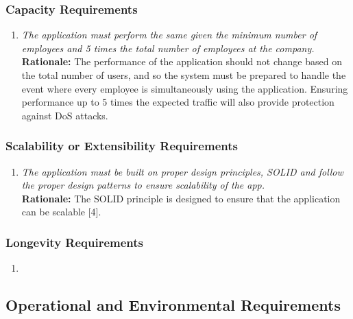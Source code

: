 \documentclass[]{article}
\begin{document}
\begin{enumerate}[{\bf BE1.}]
\subsubsection{Capacity Requirements}
\label{ssub:capacity_requirements}
\begin{enumerate}[{PR-C}1. ]
    \item \emph{The application must perform the same given the minimum number of employees and 5 times the total number of employees at the company.}\\
    {\bf Rationale:} The performance of the application should not change based on the total number of users, and so the system must be prepared to handle the event where every employee is simultaneously using the application. Ensuring performance up to 5 times the expected traffic will also provide protection against DoS attacks.
\end{enumerate}


\subsubsection{Scalability or Extensibility Requirements}
\label{ssub:scalability_or_extensibility_requirements}
\begin{enumerate}[{PR-SE}1. ]
    \item \emph{The application must be built on proper design principles, SOLID and follow the proper design patterns to ensure scalability of the app.}\\
    {\bf Rationale:} The SOLID principle is designed to ensure that the application can be scalable [4].
\end{enumerate}


\subsubsection{Longevity Requirements}
\label{ssub:longevity_requirements}
\begin{enumerate}[{NA}]
    \item
\end{enumerate}




\subsection{Operational and Environmental Requirements}
\label{sub:operational_and_environmental_requirements}



\end{enumerate}
\end{document}
